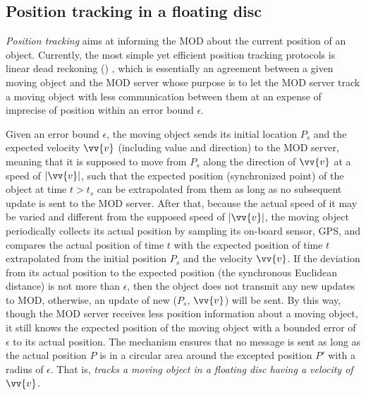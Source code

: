 \subsection{Position tracking in a floating disc}

\textit{Position tracking} aims at informing the MOD about the current position of an object. Currently, the most simple yet efficient position tracking protocols is linear dead reckoning (\ldr) \cite{Wolfson:PositionTracking}, which is essentially an agreement between a given moving object and the MOD server whose purpose is to let the MOD server track a moving object with less communication between them at an expense of imprecise of position within an error bound $\epsilon$.  

Given an error bound $\epsilon$, the moving object sends its initial location $P_s$ and the expected velocity $\vv{v}$
(including value and direction) to the MOD server, meaning that it is supposed to move from $P_s$ along the direction of $\vv{v}$ at a speed of $|\vv{v}|$, such that the expected position (\ie synchronized point) of the object at time $t>t_s$ can be extrapolated from them as long as no subsequent update is sent to the MOD server. 
After that, because the actual speed of it may be varied and different from the supposed speed of $|\vv{v}|$, the moving object periodically collects its actual position by sampling its on-board sensor, \eg GPS, and compares the actual position of time $t$ with the expected position of time $t$ extrapolated from the initial position $P_s$ and the velocity $\vv{v}$. 
If the deviation from its actual position to the expected position (\ie the synchronous Euclidean distance) is not more than $\epsilon$, then the object does not transmit any new updates to MOD, otherwise, an update of new ($P_s$, $\vv{v}$) will be sent.
%
By this way, though the MOD server receives less position information about a moving object, it still knows the expected position of the moving object with a bounded error of $\epsilon$ to its actual position. The \ldr mechanism ensures that no message is sent as long as the actual position $P$ is in a circular area around the excepted position $P'$ with a radius of $\epsilon$. That is, \emph{\ldr tracks a moving object in a floating disc having a velocity of $\vv{v}$.}


